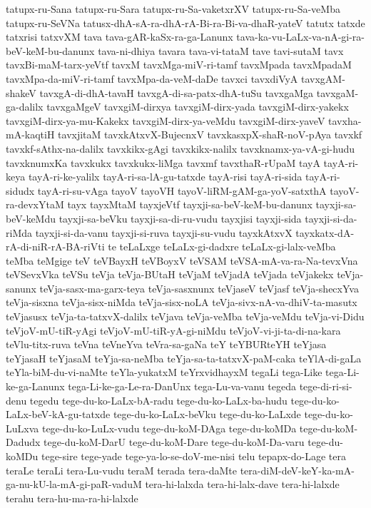 {tatupx-ru-Sana
tatupx-ru-Sara
tatupx-ru-Sa-vaketxrXV
tatupx-ru-Sa-veMba
tatupx-ru-SeVNa
tatusx-dhA-sA-ra-dhA-rA-Bi-ra-Bi-va-dhaR-yateV
tatutx
tatxde
tatxrisi
tatxvXM
tava
tava-gAR-kaSx-ra-ga-Lanunx
tava-ka-vu-LaLx-va-nA-gi-ra-beV-keM-bu-danunx
tava-ni-dhiya
tavara
tava-vi-tataM
tave
tavi-sutaM
tavx
tavxBi-maM-tarx-yeVtf
tavxM
tavxMga-miV-ri-tamf
tavxMpada
tavxMpadaM
tavxMpa-da-miV-ri-tamf
tavxMpa-da-veM-daDe
tavxci
tavxdiVyA
tavxgAM-shakeV
tavxgA-di-dhA-tavaH
tavxgA-di-sa-patx-dhA-tuSu
tavxgaMga
tavxgaM-ga-dalilx
tavxgaMgeV
tavxgiM-dirxya
tavxgiM-dirx-yada
tavxgiM-dirx-yakekx
tavxgiM-dirx-ya-mu-Kakekx
tavxgiM-dirx-ya-veMdu
tavxgiM-dirx-yaveV
tavxha-mA-kaqtiH
tavxjitaM
tavxkAtxvX-BujecnxV
tavxkasxpX-shaR-noV-pAya
tavxkf
tavxkf-sAthx-na-dalilx
tavxkikx-gAgi
tavxkikx-nalilx
tavxknamx-ya-vA-gi-hudu
tavxknumxKa
tavxkukx
tavxkukx-liMga
tavxmf
tavxthaR-rUpaM
tayA
tayA-ri-keya
tayA-ri-ke-yalilx
tayA-ri-sa-lA-gu-tatxde
tayA-risi
tayA-ri-sida
tayA-ri-sidudx
tayA-ri-su-vAga
tayoV
tayoVH
tayoV-liRM-gAM-ga-yoV-satxthA
tayoV-ra-devxYtaM
tayx
tayxMtaM
tayxjeVtf
tayxji-sa-beV-keM-bu-danunx
tayxji-sa-beV-keMdu
tayxji-sa-beVku
tayxji-sa-di-ru-vudu
tayxjisi
tayxji-sida
tayxji-si-da-riMda
tayxji-si-da-vanu
tayxji-si-ruva
tayxji-su-vudu
tayxkAtxvX
tayxkatx-dA-rA-di-niR-rA-BA-riVti
te
teLaLxge
teLaLx-gi-dadxre
teLaLx-gi-lalx-veMba
teMba
teMgige
teV
teVBayxH
teVBoyxV
teVSAM
teVSA-mA-va-ra-Na-tevxVna
teVSevxVka
teVSu
teVja
teVja-BUtaH
teVjaM
teVjadA
teVjada
teVjakekx
teVja-sanunx
teVja-sasx-ma-garx-teya
teVja-sasxnunx
teVjaseV
teVjasf
teVja-shecxYva
teVja-sisxna
teVja-sisx-niMda
teVja-sisx-noLA
teVja-sivx-nA-va-dhiV-ta-masutx
teVjasusx
teVja-ta-tatxvX-dalilx
teVjava
teVja-veMba
teVja-veMdu
teVja-vi-Didu
teVjoV-mU-tiR-yAgi
teVjoV-mU-tiR-yA-gi-niMdu
teVjoV-vi-ji-ta-di-na-kara
teVlu-titx-ruva
teVna
teVneYva
teVra-sa-gaNa
teY
teYBURteYH
teYjasa
teYjasaH
teYjasaM
teYja-sa-neMba
teYja-sa-ta-tatxvX-paM-caka
teYlA-di-gaLa
teYla-biM-du-vi-naMte
teYla-yukatxM
teYrxvidhayxM
tegaLi
tega-Like
tega-Li-ke-ga-Lanunx
tega-Li-ke-ga-Le-ra-DanUnx
tega-Lu-va-vanu
tegeda
tege-di-ri-si-denu
tegedu
tege-du-ko-LaLx-bA-radu
tege-du-ko-LaLx-ba-hudu
tege-du-ko-LaLx-beV-kA-gu-tatxde
tege-du-ko-LaLx-beVku
tege-du-ko-LaLxde
tege-du-ko-LuLxva
tege-du-ko-LuLx-vudu
tege-du-koM-DAga
tege-du-koMDa
tege-du-koM-Dadudx
tege-du-koM-DarU
tege-du-koM-Dare
tege-du-koM-Da-varu
tege-du-koMDu
tege-sire
tege-yade
tege-ya-lo-se-doV-me-nisi
telu
tepapx-do-Lage
tera
teraLe
teraLi
tera-Lu-vudu
teraM
terada
tera-daMte
tera-diM-deV-keY-ka-mA-ga-nu-kU-la-mA-gi-paR-vaduM
tera-hi-lalxda
tera-hi-lalx-dave
tera-hi-lalxde
terahu
tera-hu-ma-ra-hi-lalxde
}
